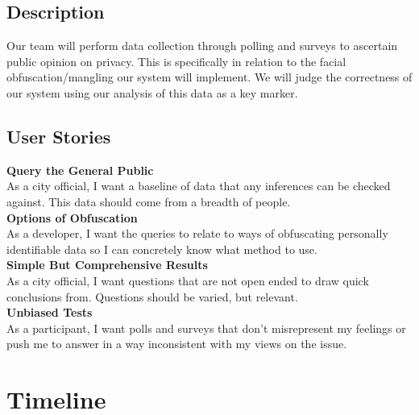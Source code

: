 \subsection{Description}

Our team will perform data collection through polling and surveys to ascertain public opinion on privacy. This is specifically in relation to the facial obfuscation/mangling our system will implement. We will judge the correctness of our system using our analysis of this data as a key marker.  

\subsection{User Stories}

\textbf{Query the General Public} 
\\
As a city official, I want a baseline of data that any inferences can be checked against. This data should come from a breadth of people.
\\
\textbf{Options of Obfuscation} 
\\
As a developer, I want the queries to relate to ways of obfuscating personally identifiable data so I can concretely know what method to use. 
\\
\textbf{Simple But Comprehensive Results} 
\\
As a city official, I want questions that are not open ended to draw quick conclusions from. Questions should be varied, but relevant. 
\\
\textbf{Unbiased Tests} 
\\
As a participant, I want polls and surveys that don't misrepresent my feelings or push me to answer in a way inconsistent with my views on the issue.

\section{Timeline}

